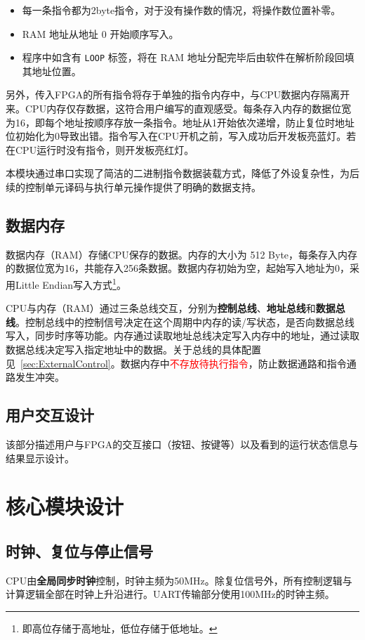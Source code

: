 \documentclass[lang=cn,a4paper,newtx]{elegantpaper}
\begin{document}
\begin{itemize}
  \item 每一条指令都为2byte指令，对于没有操作数的情况，将操作数位置补零。
  \item RAM 地址从地址 0 开始顺序写入。
  \item 程序中如含有 \texttt{LOOP} 标签，将在 RAM 地址分配完毕后由软件在解析阶段回填其地址位置。
\end{itemize}

另外，传入FPGA的所有指令将存于单独的指令内存中，与CPU数据内存隔离开来。CPU内存仅存数据，这符合用户编写的直观感受。每条存入内存的数据位宽为16，即每个地址按顺序存放一条指令。地址从1开始依次递增，防止复位时地址位初始化为0导致出错。指令写入在CPU开机之前，写入成功后开发板亮蓝灯。若在CPU运行时没有指令，则开发板亮红灯。

本模块通过串口实现了简洁的二进制指令数据装载方式，降低了外设复杂性，为后续的控制单元译码与执行单元操作提供了明确的数据支持。


\subsection{数据内存}
数据内存（RAM）存储CPU保存的数据。内存的大小为 512 Byte，每条存入内存的数据位宽为16，共能存入256条数据。数据内存初始为空，起始写入地址为0，采用Little Endian写入方式\footnote{即高位存储于高地址，低位存储于低地址。}。

CPU与内存（RAM）通过三条总线交互，分别为\textbf{控制总线}、\textbf{地址总线}和\textbf{数据总线}。控制总线中的控制信号决定在这个周期中内存的读/写状态，是否向数据总线写入，同步时序等功能。内存通过读取地址总线决定写入内存中的地址，通过读取数据总线决定写入指定地址中的数据。关于总线的具体配置见~\ref{sec:ExternalControl}。数据内存中\textcolor{red}{不存放待执行指令}，防止数据通路和指令通路发生冲突。


\subsection{用户交互设计}\label{sec:interaction}
该部分描述用户与FPGA的交互接口（按钮、按键等）以及看到的运行状态信息与结果显示设计。


\section{核心模块设计}
\subsection{时钟、复位与停止信号}
CPU由\textbf{全局同步时钟}控制，时钟主频为50MHz。除复位信号外，所有控制逻辑与计算逻辑全部在时钟上升沿进行。UART传输部分使用100MHz的时钟主频。
\end{document}
